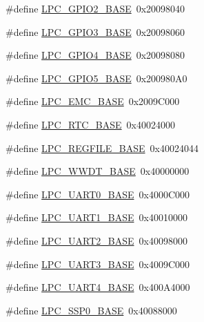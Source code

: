 \begin{DoxyCompactItemize}
\item 
\#define \hyperlink{group__PERIPH__407X__8X__BASE_gae5524b2d728167194033ec7a1841a36b}{L\-P\-C\-\_\-\-G\-P\-I\-O2\-\_\-\-B\-A\-S\-E}~0x20098040
\item 
\#define \hyperlink{group__PERIPH__407X__8X__BASE_ga56c68c5326b521b3278a35f4d81369a9}{L\-P\-C\-\_\-\-G\-P\-I\-O3\-\_\-\-B\-A\-S\-E}~0x20098060
\item 
\#define \hyperlink{group__PERIPH__407X__8X__BASE_gaa54352e7745932e78b56bcbc1d70fa21}{L\-P\-C\-\_\-\-G\-P\-I\-O4\-\_\-\-B\-A\-S\-E}~0x20098080
\item 
\#define \hyperlink{group__PERIPH__407X__8X__BASE_gaf6bbc732156be98ff8a4d15fa7558ad6}{L\-P\-C\-\_\-\-G\-P\-I\-O5\-\_\-\-B\-A\-S\-E}~0x200980\-A0
\item 
\#define \hyperlink{group__PERIPH__407X__8X__BASE_ga52f586bf3c6855ad4ef03b1fee3f2f0d}{L\-P\-C\-\_\-\-E\-M\-C\-\_\-\-B\-A\-S\-E}~0x2009\-C000
\item 
\#define \hyperlink{group__PERIPH__407X__8X__BASE_ga4618213cf968f8245814d7d3e7aa2e2e}{L\-P\-C\-\_\-\-R\-T\-C\-\_\-\-B\-A\-S\-E}~0x40024000
\item 
\#define \hyperlink{group__PERIPH__407X__8X__BASE_gad2674eff10cea9243ab060ad1fbac9d2}{L\-P\-C\-\_\-\-R\-E\-G\-F\-I\-L\-E\-\_\-\-B\-A\-S\-E}~0x40024044
\item 
\#define \hyperlink{group__PERIPH__407X__8X__BASE_ga9b83c39ba53f9c9e87974984c96e35de}{L\-P\-C\-\_\-\-W\-W\-D\-T\-\_\-\-B\-A\-S\-E}~0x40000000
\item 
\#define \hyperlink{group__PERIPH__407X__8X__BASE_gaa96fb70405a1298b350fc6f0ad0af997}{L\-P\-C\-\_\-\-U\-A\-R\-T0\-\_\-\-B\-A\-S\-E}~0x4000\-C000
\item 
\#define \hyperlink{group__PERIPH__407X__8X__BASE_ga18e8f96b25e3f343bdd7ba552ae7a617}{L\-P\-C\-\_\-\-U\-A\-R\-T1\-\_\-\-B\-A\-S\-E}~0x40010000
\item 
\#define \hyperlink{group__PERIPH__407X__8X__BASE_ga8c3873ab74db743465b038c74b365281}{L\-P\-C\-\_\-\-U\-A\-R\-T2\-\_\-\-B\-A\-S\-E}~0x40098000
\item 
\#define \hyperlink{group__PERIPH__407X__8X__BASE_gac8dc517d5e03d4ca7666c18c89d5052e}{L\-P\-C\-\_\-\-U\-A\-R\-T3\-\_\-\-B\-A\-S\-E}~0x4009\-C000
\item 
\#define \hyperlink{group__PERIPH__407X__8X__BASE_ga52bf68ce53e20c93366ba5496e98f5c8}{L\-P\-C\-\_\-\-U\-A\-R\-T4\-\_\-\-B\-A\-S\-E}~0x400\-A4000
\item 
\#define \hyperlink{group__PERIPH__407X__8X__BASE_ga53fb1af80b541545988f2a966681abfd}{L\-P\-C\-\_\-\-S\-S\-P0\-\_\-\-B\-A\-S\-E}~0x40088000

\end{DoxyCompactItemize}
